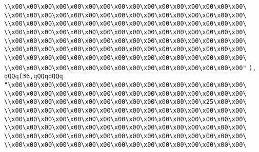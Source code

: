 \verb|\\x00\x00\x00\x00\x00\x00\x00\x00\x00\x00\x00\x00\x00\x00\x00\x00\|\newline
\verb|\\x00\x00\x00\x00\x00\x00\x00\x00\x00\x00\x00\x00\x00\x00\x00\x00\|\newline
\verb|\\x00\x00\x00\x00\x00\x00\x00\x00\x00\x00\x00\x00\x00\x00\x00\x00\|\newline
\verb|\\x00\x00\x00\x00\x00\x00\x00\x00\x00\x00\x00\x00\x00\x00\x00\x00\|\newline
\verb|\\x00\x00\x00\x00\x00\x00\x00\x00\x00\x00\x00\x00\x00\x00\x00\x00\|\newline
\verb|\\x00\x00\x00\x00\x00\x00\x00\x00\x00\x00\x00\x00\x00\x00\x00\x00\|\newline
\verb|\\x00\x00\x00\x00\x00\x00\x00\x00\x00\x00\x00\x00\x00\x00\x00\x00\|\newline
\verb|\\x00\x00\x00\x00\x00\x00\x00\x00\x00\x00\x00\x00\x00\x00\x00\x00"|\newline
\verb|),|\newline
\verb|qQQq(36,qQQqqQQq|\newline
\verb|"\x00\x00\x00\x00\x00\x00\x00\x00\x00\x00\x00\x00\x00\x00\x00\x00\|\newline
\verb|\\x00\x00\x00\x00\x00\x00\x00\x00\x00\x00\x00\x00\x00\x00\x00\x00\|\newline
\verb|\\x00\x00\x00\x00\x00\x00\x00\x00\x00\x00\x00\x00\x00\x25\x00\x00\|\newline
\verb|\\x00\x00\x00\x00\x00\x00\x00\x00\x00\x00\x00\x00\x00\x00\x00\x00\|\newline
\verb|\\x00\x00\x00\x00\x00\x00\x00\x00\x00\x00\x00\x00\x00\x00\x00\x00\|\newline
\verb|\\x00\x00\x00\x00\x00\x00\x00\x00\x00\x00\x00\x00\x00\x00\x00\x00\|\newline
\verb|\\x00\x00\x00\x00\x00\x00\x00\x00\x00\x00\x00\x00\x00\x00\x00\x00\|\newline
\verb|\\x00\x00\x00\x00\x00\x00\x00\x00\x00\x00\x00\x00\x00\x00\x00\x00\|\newline
